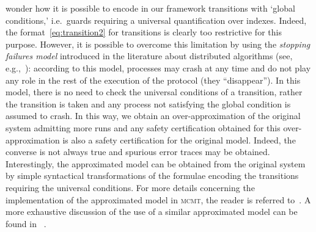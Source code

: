 \documentclass{LMCS}
\theoremstyle{plain}\newtheorem{assumption}[thm]{Assumption}
\theoremstyle{plain}\newtheorem{proposition}[thm]{Proposition}
\theoremstyle{plain}\newtheorem{property}[thm]{Property}
\theoremstyle{plain}\newtheorem{example}[thm]{Example}
\theoremstyle{plain}\newtheorem{claim}[thm]{Claim}
\theoremstyle{plain}\newtheorem{lemma}[thm]{Lemma}
\begin{document}
  wonder how it is possible to encode in our framework transitions
  with `global conditions,' i.e.\ guards requiring a universal
  quantification over indexes.  Indeed, the
  format~\eqref{eq:transition2} for transitions is clearly too
  restrictive for this purpose.  However, it is possible to overcome
  this limitation by using the \emph{stopping failures model}
  introduced in the literature about distributed algorithms (see,
  e.g.,~\cite{dalg}): according to this model, processes may crash at
  any time and do not play any role in the rest of the execution of
  the protocol (they ``disappear'').  In this model, there is no need
  to check the universal conditions of a transition, rather the
  transition is taken and any process not satisfying the global
  condition is assumed to crash.  In this way, we obtain an
  over-approximation of the original system admitting more runs and
  any safety certification obtained for this over-approximation is
  also a safety certification for the original model.  Indeed, the
  converse is not always true and spurious error traces may be
  obtained.  Interestingly, the approximated model can be obtained
  from the original system by simple syntactical transformations of
  the formulae encoding the transitions requiring the universal
  conditions. For more details concerning the implementation of the
  approximated model in \textsc{mcmt}, the reader is referred
  to~\cite{stop}.  A more exhaustive discussion of the use of a
  similar approximated model can be found in ~\cite{tacas06,cav06,approx}.
\end{document}
